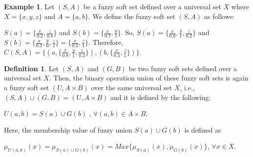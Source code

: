 \documentclass{article}
\theoremstyle{definition}
\newtheorem{definition}{Definition}[section]
\newtheorem{example}{Example}[section]
\begin{document}
\begin{example}
    Let $(S, A)$ be a fuzzy soft set defined over a universal set $X$ where  $X=\{x, y, z\}$ and $A=\{a, b\}$. We define the fuzzy soft set $(S, A)$ as follows:

    $ S(a)=\{\frac{x}{0.2}, \frac{z}{0.8}\}$ and $S(b)=\{\frac{x}{0.7}, \frac{y}{1}\}$. So, $\overline {S(a)}=\{\frac{x}{0.8},\frac{y}{1}, \frac{z}{0.2}\}$ and $\overline {S(b)}=\{\frac{x}{0.3},\frac{y}{0}, \frac{z}{1}\}=\{\frac{x}{0.3}, \frac{z}{1}\}$. Therefore, $C(S,A)=\{(a,\{\frac{x}{0.8},\frac{y}{1}, \frac{z}{0.2}\}), (b,\{\frac{x}{0.3}, \frac{z}{1}\})\}$.
    
\end{example}

\begin{definition}
    Let $(S, A)$ and $(G,B)$ be two fuzzy soft sets defined over a universal set $X$. Then, the binary operation union of these fuzzy soft sets is again a fuzzy soft set $(U, A \times B)$ over the same universal set $X$, i.e., $(S,A) \cup (G,B)=(U, A\times B)$ and it is defined by the following:

    $U(a, b)=S(a)\cup G(b)$ , $\forall (a ,b) \in A\times B$.

    Here, the membership value of fuzzy union $S(a)\cup G(b)$ is defined as

    $\mu_{U(a,b)}(x) = \mu_{S(a)\cup G(b)}(x) = Max\{\mu_{S(a)}(x), \mu_{G(b)}(x)\}$, $\forall x\in X$.
\end{definition}
\end{document}
